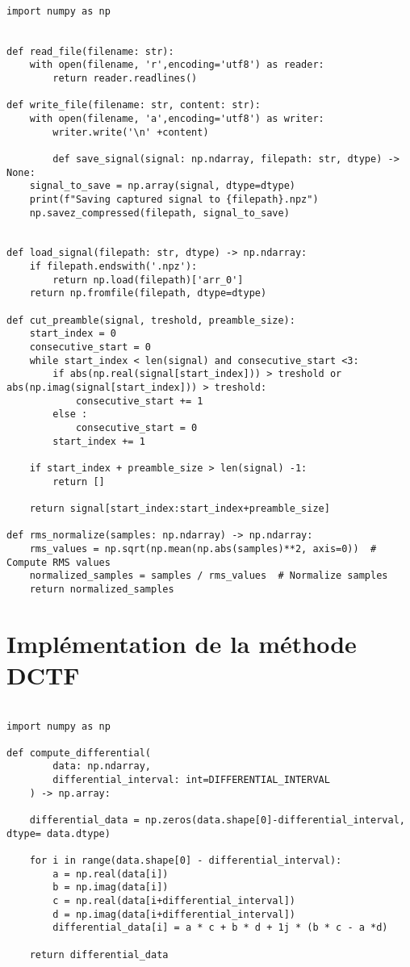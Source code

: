 \begin{lstlisting}[style=pythonstyle, caption={Preprocessing}, label={lst:python}]

import numpy as np


def read_file(filename: str):
    with open(filename, 'r',encoding='utf8') as reader:
        return reader.readlines()

def write_file(filename: str, content: str):
    with open(filename, 'a',encoding='utf8') as writer:
        writer.write('\n' +content)
        
        def save_signal(signal: np.ndarray, filepath: str, dtype) -> None:
    signal_to_save = np.array(signal, dtype=dtype)
    print(f"Saving captured signal to {filepath}.npz")
    np.savez_compressed(filepath, signal_to_save)


def load_signal(filepath: str, dtype) -> np.ndarray:
    if filepath.endswith('.npz'):
        return np.load(filepath)['arr_0']
    return np.fromfile(filepath, dtype=dtype)
    
def cut_preamble(signal, treshold, preamble_size):
    start_index = 0
    consecutive_start = 0
    while start_index < len(signal) and consecutive_start <3:
        if abs(np.real(signal[start_index])) > treshold or abs(np.imag(signal[start_index])) > treshold:
            consecutive_start += 1
        else :
            consecutive_start = 0
        start_index += 1

    if start_index + preamble_size > len(signal) -1:
        return []

    return signal[start_index:start_index+preamble_size]

def rms_normalize(samples: np.ndarray) -> np.ndarray:
    rms_values = np.sqrt(np.mean(np.abs(samples)**2, axis=0))  # Compute RMS values
    normalized_samples = samples / rms_values  # Normalize samples
    return normalized_samples
\end{lstlisting}

\section{Implémentation de la méthode DCTF}\label{codedctf}

\begin{lstlisting}[style=pythonstyle, caption={Méthode DCTF}, label={lst:python}]

import numpy as np

def compute_differential(
        data: np.ndarray,
        differential_interval: int=DIFFERENTIAL_INTERVAL
    ) -> np.array:

    differential_data = np.zeros(data.shape[0]-differential_interval, dtype= data.dtype)

    for i in range(data.shape[0] - differential_interval):
        a = np.real(data[i])
        b = np.imag(data[i])
        c = np.real(data[i+differential_interval])
        d = np.imag(data[i+differential_interval])
        differential_data[i] = a * c + b * d + 1j * (b * c - a *d)

    return differential_data

\end{lstlisting}